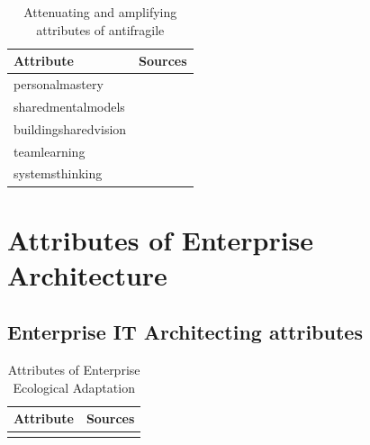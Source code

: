 \begin{table}[H]
	\begin{center}
		\begin{tabular}{@{}ll@{}}
			\toprule
			\textbf{Attribute} & \textbf{Sources} \\%
			\midrule%
			\Gls{personalmastery} & \parencite{Botjes2020} \\%
			\Gls{sharedmentalmodels} & \parencite{Botjes2020} \\%
			\Gls{buildingsharedvision} & \parencite{Botjes2020} \\%
			\Gls{teamlearning} & \parencite{Botjes2020} \\%
			\Gls{systemsthinking} & \parencite{Botjes2020} \\%
			\bottomrule%
		\end{tabular}
		\caption[Attenuating and amplifying attributes of \gls{antifragile}]{Attenuating and amplifying attributes of \gls{antifragile}}
		\label{tab:attenuatingandamplifyingattributes}
	\end{center}
\end{table}	

\section{Attributes of Enterprise Architecture}
\label{sec:attributesonea}

\subsection{Enterprise IT Architecting attributes}
\label{sub:enterpriseitarchitecting}
\begin{table}[H]%
	\begin{center}%
		\begin{tabular}{@{}ll@{}}%
			\toprule%
			\textbf{Attribute} & \textbf{Sources} \\%
			\midrule%
			 & \parencite{Lapalme2012} \\%
			\bottomrule%
		\end{tabular}%
		\caption[Attributes of Enterprise Ecological Adaptation]{Attributes of Enterprise Ecological Adaptation}%
		\label{tab:attributesofenterpriseitarchitecting}%
	\end{center}%
\end{table}%


